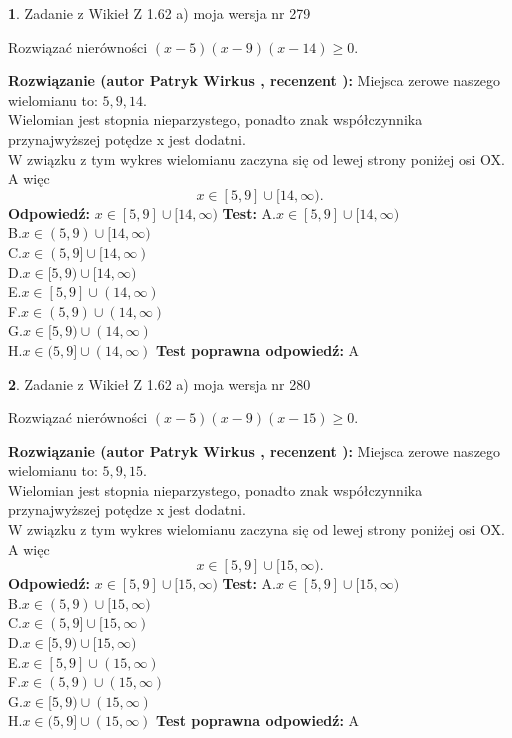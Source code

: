 \documentclass[12pt, a4paper]{article}
\theoremstyle{definition} %
\newtheorem{zad}{}
\newcommand{\zadStart}[1]{\begin{zad}#1\newline}
\newcommand{\zadStop}{\end{zad}}
\newcommand{\rozwStart}[2]{\noindent \textbf{Rozwiązanie (autor #1 , recenzent #2): }\newline}
\newcommand{\rozwStop}{\newline}
\newcommand{\odpStart}{\noindent \textbf{Odpowiedź:}\newline}
\newcommand{\odpStop}{\newline}
\newcommand{\testStart}{\noindent \textbf{Test:}\newline}
\newcommand{\testStop}{\newline}
\newcommand{\kluczStart}{\noindent \textbf{Test poprawna odpowiedź:}\newline}
\newcommand{\kluczStop}{\newline}
\begin{document}
\zadStart{Zadanie z Wikieł Z 1.62 a) moja wersja nr 279}

Rozwiązać nierówności $(x-5)(x-9)(x-14)\ge0$.
\zadStop
\rozwStart{Patryk Wirkus}{}
Miejsca zerowe naszego wielomianu to: $5, 9, 14$.\\
Wielomian jest stopnia nieparzystego, ponadto znak współczynnika przy\linebreak najwyższej potędze x jest dodatni.\\ W związku z tym wykres wielomianu zaczyna się od lewej strony poniżej osi OX. A więc $$x \in [5,9] \cup [14,\infty).$$
\rozwStop
\odpStart
$x \in [5,9] \cup [14,\infty)$
\odpStop
\testStart
A.$x \in [5,9] \cup [14,\infty)$\\
B.$x \in (5,9) \cup [14,\infty)$\\
C.$x \in (5,9] \cup [14,\infty)$\\
D.$x \in [5,9) \cup [14,\infty)$\\
E.$x \in [5,9] \cup (14,\infty)$\\
F.$x \in (5,9) \cup (14,\infty)$\\
G.$x \in [5,9) \cup (14,\infty)$\\
H.$x \in (5,9] \cup (14,\infty)$
\testStop
\kluczStart
A
\kluczStop



\zadStart{Zadanie z Wikieł Z 1.62 a) moja wersja nr 280}

Rozwiązać nierówności $(x-5)(x-9)(x-15)\ge0$.
\zadStop
\rozwStart{Patryk Wirkus}{}
Miejsca zerowe naszego wielomianu to: $5, 9, 15$.\\
Wielomian jest stopnia nieparzystego, ponadto znak współczynnika przy\linebreak najwyższej potędze x jest dodatni.\\ W związku z tym wykres wielomianu zaczyna się od lewej strony poniżej osi OX. A więc $$x \in [5,9] \cup [15,\infty).$$
\rozwStop
\odpStart
$x \in [5,9] \cup [15,\infty)$
\odpStop
\testStart
A.$x \in [5,9] \cup [15,\infty)$\\
B.$x \in (5,9) \cup [15,\infty)$\\
C.$x \in (5,9] \cup [15,\infty)$\\
D.$x \in [5,9) \cup [15,\infty)$\\
E.$x \in [5,9] \cup (15,\infty)$\\
F.$x \in (5,9) \cup (15,\infty)$\\
G.$x \in [5,9) \cup (15,\infty)$\\
H.$x \in (5,9] \cup (15,\infty)$
\testStop
\kluczStart
A
\kluczStop
\end{document}
